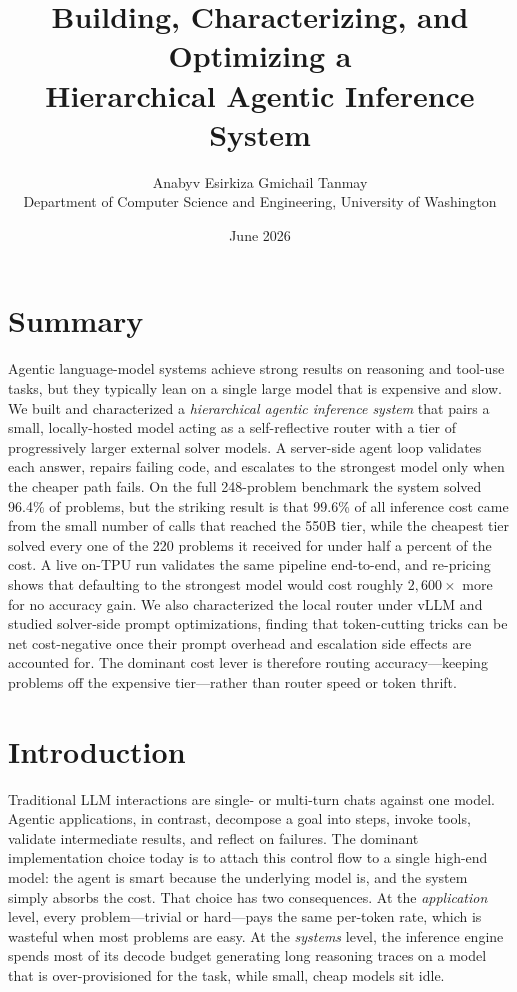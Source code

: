 \documentclass[10pt]{article}
\title{\vspace{-2.5em}\textbf{Building, Characterizing, and Optimizing a\\
Hierarchical Agentic Inference System}}
\author{Anabyv \quad Esirkiza \quad Gmichail \quad Tanmay\\
\normalsize Department of Computer Science and Engineering, University of Washington}
\date{\normalsize June 2026}
\begin{document}
\maketitle
\vspace{-1.5em}

\section*{Summary}
Agentic language-model systems achieve strong results on reasoning and tool-use
tasks, but they typically lean on a single large model that is expensive and slow.
We built and characterized a \emph{hierarchical agentic inference system} that pairs
a small, locally-hosted model acting as a self-reflective router with a tier of
progressively larger external solver models. A server-side agent loop validates each
answer, repairs failing code, and escalates to the strongest model only when the
cheaper path fails. On the full 248-problem benchmark the system solved 96.4\% of
problems, but the striking result is that 99.6\% of all inference cost came from the
small number of calls that reached the 550B tier, while the cheapest tier solved every
one of the 220 problems it received for under half a percent of the cost. A live
on-TPU run validates the same pipeline end-to-end, and re-pricing shows that defaulting
to the strongest model would cost roughly $2{,}600\times$ more for no accuracy gain. We
also characterized the local router under vLLM and studied solver-side prompt
optimizations, finding that token-cutting tricks can be net cost-negative once their
prompt overhead and escalation side effects are accounted for. The dominant cost lever
is therefore routing accuracy---keeping problems off the expensive tier---rather than
router speed or token thrift.

\section{Introduction}
\label{sec:introduction}
Traditional LLM interactions are single- or multi-turn chats against one model.
Agentic applications, in contrast, decompose a goal into steps, invoke tools,
validate intermediate results, and reflect on failures. The dominant implementation
choice today is to attach this control flow to a single high-end model: the agent is
smart because the underlying model is, and the system simply absorbs the cost. That
choice has two consequences. At the \emph{application} level, every problem---trivial
or hard---pays the same per-token rate, which is wasteful when most problems are easy.
At the \emph{systems} level, the inference engine spends most of its decode budget
generating long reasoning traces on a model that is over-provisioned for the task,
while small, cheap models sit idle.
\end{document}
